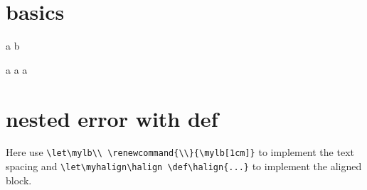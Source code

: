 \documentclass{article}
\begin{document}
\hfuzz=50pt

\section{basics}

\def\txt{a}
\def\foo{\txt}
\let\bar\foo
\bar
\def\txt{b}
\bar

\def\txt{a}
\def\foo{\txt}
\edef\bar{\foo}
\bar
\def\txt{b}
\bar
\def\foo{c}
\bar


\section{nested error with def}

Here use \verb|\let\mylb\\ \renewcommand{\\}{\mylb[1cm]}| to implement the text spacing and \verb|\let\myhalign\halign \def\halign{...}| to implement the aligned block.
\newenvironment{CondensedAlign*}{%
    \let\mylb\\
    \renewcommand{\\}{\mylb[1cm]}

    \let\myhalign\halign
    \def\halign{%
        \let\mylb\\
        \renewcommand{\\}{\mylb[1cm]}
        \myhalign
    }
    test\\
    test
    \par\vspace{0ex}%
    $\aligned
}{
    \endaligned$
    \par\vspace{+1ex}%
    \renewcommand{\\}{\mylb}
}
\end{document}
